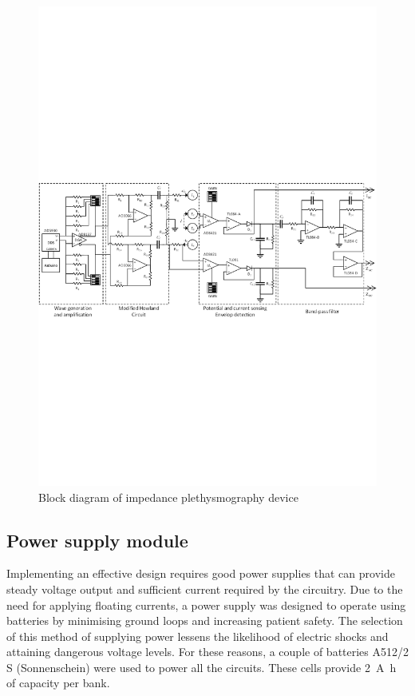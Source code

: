 \begin{landscape}\centering
	\vspace*{\fill}
	\begin{figure}[!htp]
		\includegraphics[height=0.59\textheight,keepaspectratio]{figure2}
		\caption{Block diagram of impedance plethysmography device}
		\label{fig:block}
	\end{figure}
	\vspace*{\fill}
\end{landscape}

\subsection{Power supply module}
\label{section design battery}
Implementing an effective design requires good power supplies that can provide steady voltage output and sufficient current required by the circuitry. Due to the need for applying floating currents, a power supply was designed to operate using batteries by minimising ground loops and increasing patient safety.  The selection of this method of supplying power lessens the likelihood of electric shocks and attaining dangerous voltage levels. For these reasons, a couple of batteries A512/2 S (Sonnenschein) were used to power all the circuits. These cells provide \SI{2}{\ampere\hour} of capacity per bank.

